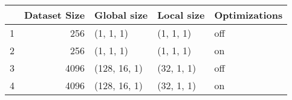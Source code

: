\begin{tabular}{lrlll}
\toprule
{} &  Dataset Size &   Global size &  Local size & Optimizations \\
\midrule
1 &           256 &     (1, 1, 1) &   (1, 1, 1) &           off \\
2 &           256 &     (1, 1, 1) &   (1, 1, 1) &            on \\
3 &          4096 &  (128, 16, 1) &  (32, 1, 1) &           off \\
4 &          4096 &  (128, 16, 1) &  (32, 1, 1) &            on \\
\bottomrule
\end{tabular}
